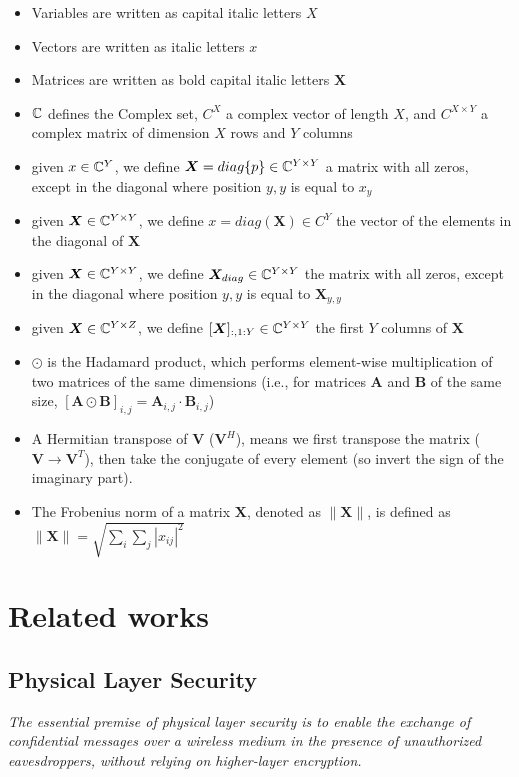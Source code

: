 \begin{itemize}
  \item Variables are written as capital italic letters $X$
  \item Vectors are written as italic letters $x$
  \item Matrices are written as bold capital italic letters $\bm{X}$
  \item $\mathbb{C}$ defines the Complex set, $C^X$ a complex vector of length $X$, and $C^{X \times Y}$ a complex matrix of dimension $X$ rows and $Y$ columns
  \item given $x \in \mathbb{C}^Y$, we define $\bm{X} = diag\{p\} \in \mathbb{C}^{Y \times Y}$ a matrix with all zeros, except in the diagonal where position $y,y$ is equal to $x_y$
  \item given $\bm{X} \in \mathbb{C}^{Y \times Y}$, we define $x = diag(\bm{X}) \in C^Y$ the vector of the elements in the diagonal of $\bm{X}$
  \item given $\bm{X} \in \mathbb{C}^{Y \times Y}$, we define $\bm{X}_{diag} \in \mathbb{C}^{Y \times Y}$ the matrix with all zeros, except in the diagonal where position $y,y$ is equal to $\bm{X}_{y,y}$
  \item given $\bm{X} \in \mathbb{C}^{Y \times Z}$, we define $[\bm{X}]_{:,1:Y} \in \mathbb{C}^{Y \times Y}$ the first $Y$ columns of $\bm{X}$
  \item $\odot$ is the Hadamard product, which performs element-wise multiplication of two matrices of the same dimensions (i.e., for matrices $\bm{A}$ and $\bm{B}$ of the same size, $[\bm{A} \odot \bm{B}]_{i,j} = \bm{A}_{i,j} \cdot \bm{B}_{i,j}$)
  \item A Hermitian transpose of $\bm{V}$ ($\bm{V}^H$), means we first transpose the matrix ($\bm{V} \rightarrow \bm{V}^T$), then take the conjugate of every element (so invert the sign of the imaginary part).
  \item The Frobenius norm of a matrix $\bm{X}$, denoted as $\|\bm{X}\|$, is defined as $\|\bm{X}\| = \sqrt{\sum_{i}\sum_{j} |x_{ij}|^2}$
\end{itemize}

\newpage
\section{Related works}
\subsection{Physical Layer Security}

\textit{The essential premise of physical layer security is to enable the exchange of confidential messages over a wireless medium in the presence of unauthorized eavesdroppers, without relying on higher-layer encryption.}\cite{6739367}

